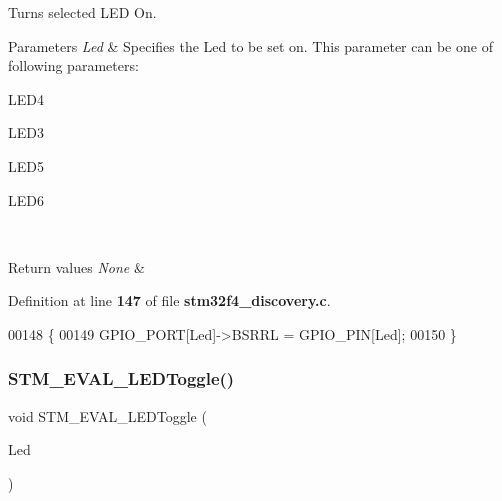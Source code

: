 Turns selected L\+ED On. 


\begin{DoxyParams}{Parameters}
{\em Led} & Specifies the Led to be set on. This parameter can be one of following parameters\+: \begin{DoxyItemize}
\item L\+E\+D4 \item L\+E\+D3 \item L\+E\+D5 \item L\+E\+D6 \end{DoxyItemize}
\\
\hline
\end{DoxyParams}

\begin{DoxyRetVals}{Return values}
{\em None} & \\
\hline
\end{DoxyRetVals}


Definition at line \textbf{ 147} of file \textbf{ stm32f4\+\_\+discovery.\+c}.


\begin{DoxyCode}
00148 \{
00149   GPIO_PORT[Led]->BSRRL = GPIO_PIN[Led];
00150 \}
\end{DoxyCode}
\mbox{\label{group__STM32F4__DISCOVERY__LOW__LEVEL__Private__Functions_ga5b1ccd57cf505c1d41440e62a845e4a9}} 
\subsubsection{S\+T\+M\+\_\+\+E\+V\+A\+L\+\_\+\+L\+E\+D\+Toggle()}
{\footnotesize\ttfamily void S\+T\+M\+\_\+\+E\+V\+A\+L\+\_\+\+L\+E\+D\+Toggle (\begin{DoxyParamCaption}\item[{\textbf{ Led\+\_\+\+Type\+Def}}]{Led }\end{DoxyParamCaption})}



